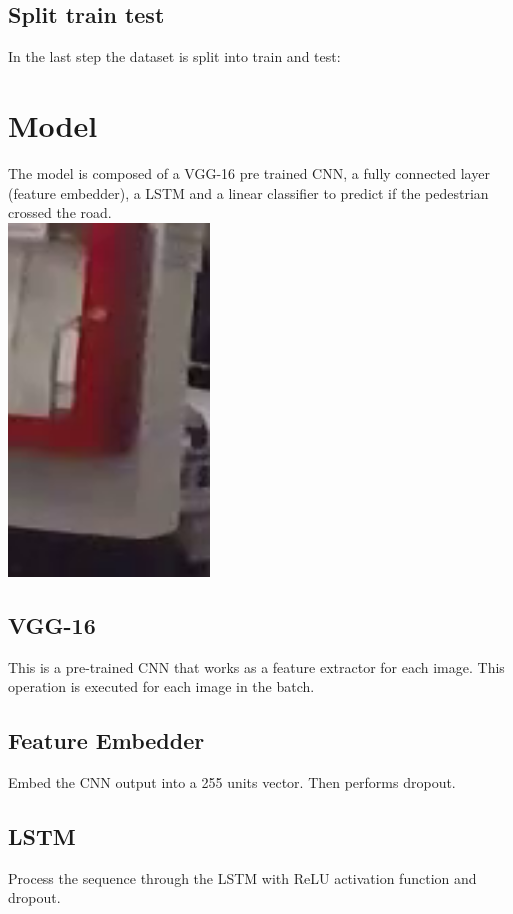 \documentclass[11pt]{article}
\begin{document}
\subsection*{Split train test}
    In the last step the dataset is split into train and test:
    \\
\section{Model}
The model is composed of a VGG-16 pre trained CNN, a fully connected layer (feature embedder), a LSTM and
a linear classifier to predict if the pedestrian crossed the road.\\
\includegraphics[width=0.4\textwidth]{jaaderrorcrop}\\

\subsection*{VGG-16}
This is a pre-trained CNN that works as a feature extractor for each image.
This operation is executed for each image in the batch.
\subsection*{Feature Embedder}
Embed the CNN output into a 255 units vector.
Then performs dropout.

\subsection*{LSTM}
Process the sequence through the LSTM with ReLU activation function and dropout.
\end{document}
